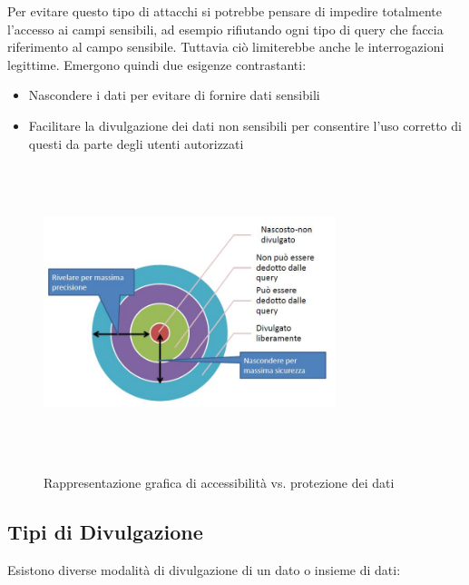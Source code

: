 Per evitare questo tipo di attacchi si potrebbe pensare di impedire totalmente l'accesso ai campi sensibili, ad esempio rifiutando ogni tipo di query che faccia riferimento al campo sensibile. Tuttavia ciò limiterebbe anche le interrogazioni legittime.
Emergono quindi due esigenze contrastanti:

\begin{itemize}
	\item Nascondere i dati per evitare di fornire dati sensibili
	\item Facilitare la divulgazione dei dati non sensibili per consentire l'uso corretto di questi da parte degli utenti autorizzati
	\end{itemize}
	
\begin{figure}[htbp]
	\centering
	{\includegraphics[height=8.5cm, width=8.5cm, keepaspectratio]{Immagini/Appendice1/prot_dati_03.JPG}}
				\caption{Rappresentazione grafica di accessibilità vs. protezione dei dati \label{fig:protezione_vs_accessibilita}}
\end{figure}

\subsection{Tipi di Divulgazione} 
Esistono diverse modalità di divulgazione di un dato o insieme di dati:

